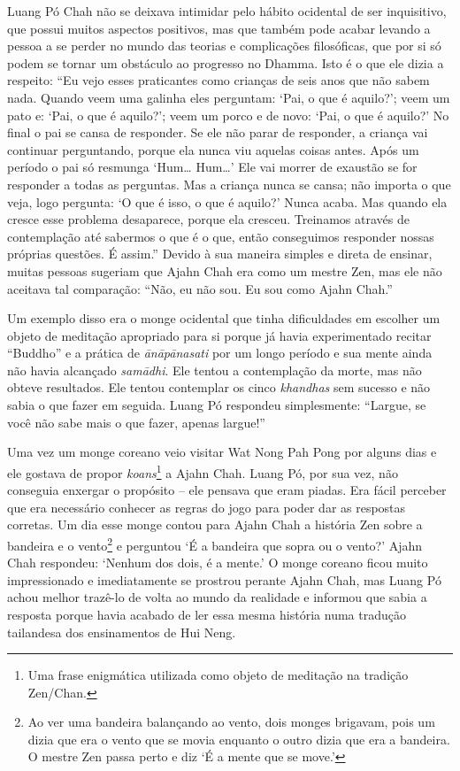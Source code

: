 Luang Pó Chah não se deixava intimidar pelo hábito ocidental de ser
inquisitivo, que possui muitos aspectos positivos, mas que também pode
acabar levando a pessoa a se perder no mundo das teorias e complicações
filosóficas, que por si só podem se tornar um obstáculo ao progresso no
Dhamma. Isto é o que ele dizia a respeito: ``Eu vejo esses praticantes
como crianças de seis anos que não sabem nada. Quando veem uma galinha
eles perguntam: `Pai, o que é aquilo?'; veem um pato e: `Pai, o que é
aquilo?'; veem um porco e de novo: `Pai, o que é aquilo?' No final o pai
se cansa de responder. Se ele não parar de responder, a criança vai
continuar perguntando, porque ela nunca viu aquelas coisas antes. Após
um período o pai só resmunga `Hum\ldots{} Hum\ldots{}' Ele vai morrer de
exaustão se for responder a todas as perguntas. Mas a criança nunca se
cansa; não importa o que veja, logo pergunta: `O que é isso, o que é
aquilo?' Nunca acaba. Mas quando ela cresce esse problema desaparece,
porque ela cresceu. Treinamos através de contemplação até sabermos o que
é o que, então conseguimos responder nossas próprias questões. É
assim.'' Devido à sua maneira simples e direta de ensinar, muitas
pessoas sugeriam que Ajahn Chah era como um mestre Zen, mas ele não
aceitava tal comparação: ``Não, eu não sou. Eu sou como Ajahn Chah.''

Um exemplo disso era o monge ocidental que tinha dificuldades em
escolher um objeto de meditação apropriado para si porque já havia
experimentado recitar ``Buddho'' e a prática de \emph{ānāpānasati} por
um longo período e sua mente ainda não havia alcançado \emph{samādhi}.
Ele tentou a contemplação da morte, mas não obteve resultados. Ele
tentou contemplar os cinco \emph{khandhas} sem sucesso e não sabia o que
fazer em seguida. Luang Pó respondeu simplesmente: ``Largue, se você não
sabe mais o que fazer, apenas largue!''

Uma vez um monge coreano veio visitar Wat Nong Pah Pong por alguns dias
e ele gostava de propor \emph{koans}\footnote{Uma frase enigmática
  utilizada como objeto de meditação na tradição Zen/Chan.} a Ajahn
Chah. Luang Pó, por sua vez, não conseguia enxergar o propósito -- ele
pensava que eram piadas. Era fácil perceber que era necessário conhecer
as regras do jogo para poder dar as respostas corretas. Um dia esse
monge contou para Ajahn Chah a história Zen sobre a bandeira e o
vento\footnote{Ao ver uma bandeira balançando ao vento, dois monges
  brigavam, pois um dizia que era o vento que se movia enquanto o outro
  dizia que era a bandeira. O mestre Zen passa perto e diz `É a mente
  que se move.'} e perguntou `É a bandeira que sopra ou o vento?' Ajahn
Chah respondeu: `Nenhum dos dois, é a mente.' O monge coreano ficou
muito impressionado e imediatamente se prostrou perante Ajahn Chah, mas
Luang Pó achou melhor trazê-lo de volta ao mundo da realidade e informou
que sabia a resposta porque havia acabado de ler essa mesma história
numa tradução tailandesa dos ensinamentos de Hui Neng.

